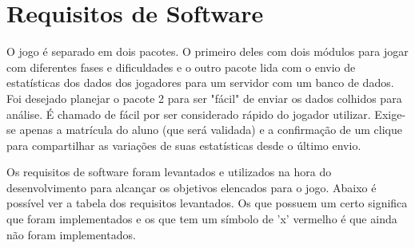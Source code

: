 \section[Requisitos de Software]{Requisitos de Software}
O jogo é separado em dois pacotes. O primeiro deles com dois módulos para jogar com diferentes fases e dificuldades e o outro pacote lida com o envio de estatísticas dos dados dos jogadores para um servidor com um banco de dados. Foi desejado planejar o pacote 2 para ser "fácil" de enviar os dados colhidos para análise. É chamado de fácil por ser considerado rápido do jogador utilizar. Exige-se apenas a matrícula do aluno (que será validada) e a confirmação de um clique para compartilhar as variações de suas estatísticas desde o último envio.

Os requisitos de software foram levantados e utilizados na hora do desenvolvimento para alcançar os objetivos elencados para o jogo. Abaixo é possível ver a tabela dos requisitos levantados. Os que possuem um certo significa que foram implementados e os que tem um símbolo de 'x' vermelho é que ainda não foram implementados.

